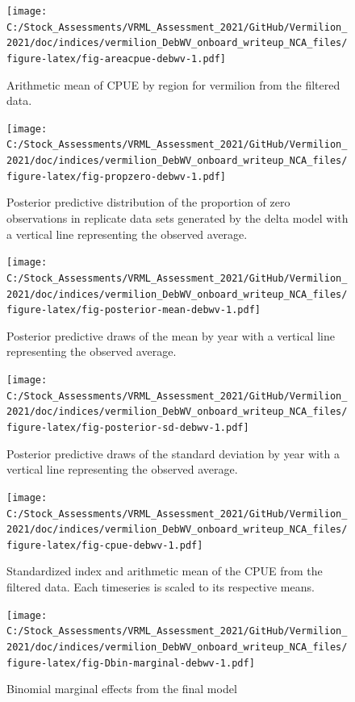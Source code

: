 \documentclass[
  english,
  a4paper,
]{article}
\begin{document}
\begin{figure}
\centering
\texttt{[image: C:/Stock\_Assessments/VRML\_Assessment\_2021/GitHub/Vermilion\_2021/doc/indices/vermilion\_DebWV\_onboard\_writeup\_NCA\_files/figure-latex/fig-areacpue-debwv-1.pdf]}
\caption{\label{fig:fig-areacpue-debwv}Arithmetic mean of CPUE by region for vermilion from the filtered data.}
\end{figure}

\begin{figure}
\centering
\texttt{[image: C:/Stock\_Assessments/VRML\_Assessment\_2021/GitHub/Vermilion\_2021/doc/indices/vermilion\_DebWV\_onboard\_writeup\_NCA\_files/figure-latex/fig-propzero-debwv-1.pdf]}
\caption{\label{fig:fig-propzero-debwv}Posterior predictive distribution of the proportion of zero observations in replicate data sets generated by the delta model with a vertical line representing the observed average.}
\end{figure}

\begin{figure}
\centering
\texttt{[image: C:/Stock\_Assessments/VRML\_Assessment\_2021/GitHub/Vermilion\_2021/doc/indices/vermilion\_DebWV\_onboard\_writeup\_NCA\_files/figure-latex/fig-posterior-mean-debwv-1.pdf]}
\caption{\label{fig:fig-posterior-mean-debwv}Posterior predictive draws of the mean by year with a vertical line representing the observed average.}
\end{figure}

\begin{figure}
\centering
\texttt{[image: C:/Stock\_Assessments/VRML\_Assessment\_2021/GitHub/Vermilion\_2021/doc/indices/vermilion\_DebWV\_onboard\_writeup\_NCA\_files/figure-latex/fig-posterior-sd-debwv-1.pdf]}
\caption{\label{fig:fig-posterior-sd-debwv}Posterior predictive draws of the standard deviation by year with a vertical line representing the observed average.}
\end{figure}

\begin{figure}
\centering
\texttt{[image: C:/Stock\_Assessments/VRML\_Assessment\_2021/GitHub/Vermilion\_2021/doc/indices/vermilion\_DebWV\_onboard\_writeup\_NCA\_files/figure-latex/fig-cpue-debwv-1.pdf]}
\caption{\label{fig:fig-cpue-debwv}Standardized index and arithmetic mean of the CPUE from the filtered data. Each timeseries is scaled to its respective means.}
\end{figure}

\begin{figure}
\centering
\texttt{[image: C:/Stock\_Assessments/VRML\_Assessment\_2021/GitHub/Vermilion\_2021/doc/indices/vermilion\_DebWV\_onboard\_writeup\_NCA\_files/figure-latex/fig-Dbin-marginal-debwv-1.pdf]}
\caption{\label{fig:fig-Dbin-marginal-debwv}Binomial marginal effects from the final model}
\end{figure}
\end{document}
